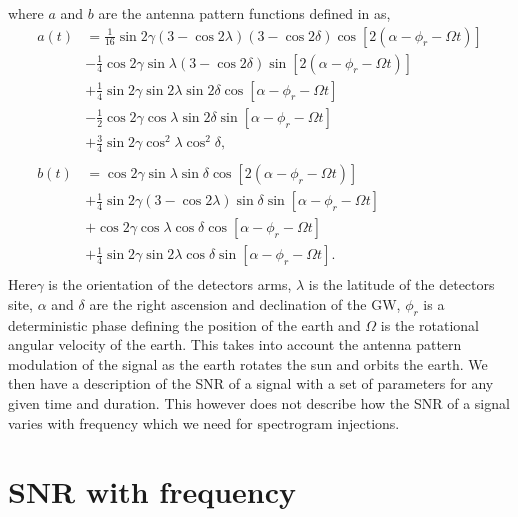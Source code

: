 where $a$ and $b$ are the antenna pattern functions defined in \citep{schutz1998DataAnalysis} as,
\begin{equation}
\begin{split}
a(t) &= \frac{1}{16}\sin{2\gamma}(3-\cos{2\lambda})(3-\cos2\delta)\cos[2(\alpha-\phi_r -\Omega t)] \\
&- \frac{1}{4}\cos{2\gamma}\sin\lambda(3-\cos2\delta)\sin[2(\alpha-\phi_r -\Omega t)] \\
&+ \frac{1}{4}\sin{2\gamma}\sin2\lambda\sin2\delta\cos[\alpha-\phi_r -\Omega t] \\
&- \frac{1}{2}\cos{2\gamma}\cos{\lambda}\sin{2\delta}\sin[\alpha-\phi_r -\Omega t] \\
&+ \frac{3}{4}\sin{2\gamma}\cos^2{\lambda}\cos^2{\delta} ,\\
\\
b(t) &= \cos{2\gamma}\sin{\lambda}\sin{\delta}\cos[2(\alpha-\phi_r -\Omega t)] \\
&+ \frac{1}{4}\sin{2\gamma}(3-\cos2\lambda)\sin{\delta}\sin[\alpha-\phi_r -\Omega t] \\
&+ \cos{2\gamma}\cos{\lambda}\cos{\delta}\cos[\alpha-\phi_r -\Omega t] \\
&+ \frac{1}{4}\sin{2\gamma}\sin{2\lambda}\cos{\delta}\sin[\alpha-\phi_r -\Omega t] .\\
\end{split}
\end{equation}
Here$\gamma$ is the orientation of the detectors arms, $\lambda$ is the latitude of the detectors site, $\alpha$ and $\delta$ are the right ascension and declination of the \gls{GW}, $\phi_r$ is a deterministic phase defining the position of the earth and $\Omega$ is the rotational angular velocity of the earth.
This takes into account the antenna pattern modulation of the signal as the earth rotates the sun and orbits the earth.
We then have a description of the \gls{SNR} of a signal with a set of parameters for any given time and duration. 
This however does not describe how the \gls{SNR} of a signal varies with frequency which we need for spectrogram injections.

\section{SNR with frequency}

